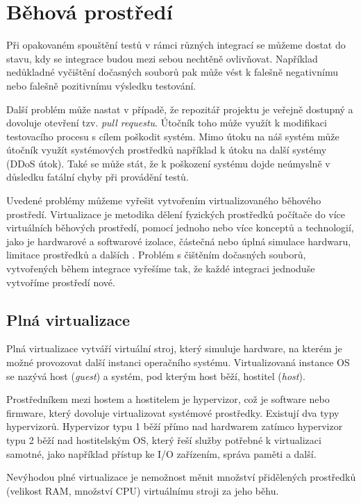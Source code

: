 \section{Běhová prostředí}

Při opakovaném spouštění testů v rámci různých integrací se můžeme dostat do stavu, kdy se integrace budou mezi sebou nechtěně ovlivňovat.
Například nedůkladné vyčištění dočasných souborů pak může vést k falešně negativnímu nebo falešně pozitivnímu výsledku testování.

Další problém může nastat v případě, že repozitář projektu je veřejně dostupný a dovoluje otevření tzv. \textit{pull requestu}.
Útočník toho může využít k modifikaci testovacího procesu s cílem poškodit systém.
Mimo útoku na náš systém může útočník využít systémových prostředků například k útoku na další systémy (DDoS útok).
Také se může stát, že k poškození systému dojde neúmyslně v důsledku fatální chyby při provádění testů.

Uvedené problémy můžeme vyřešit vytvořením virtualizovaného běhového prostředí.
Virtualizace je metodika dělení fyzických prostředků počítače do více virtuálních běhových prostředí, pomocí jednoho nebo více konceptů a technologií, jako je hardwarové a softwarové izolace, částečná nebo úplná simulace hardwaru, limitace prostředků a dalších \cite{virt_intro}.
Problém s čištěním dočasných souborů, vytvořených během integrace vyřešíme tak, že každé integraci jednoduše vytvoříme prostředí nové.

\subsection{Plná virtualizace}

Plná virtualizace vytváří virtuální stroj, který simuluje hardware, na kterém je možné provozovat další instanci operačního systému.
Virtualizovaná instance OS se nazývá host (\textit{guest}) a systém, pod kterým host běží, hostitel (\textit{host}).

Prostředníkem mezi hostem a hostitelem je hypervizor, což je software nebo firmware, který dovoluje virtualizovat systémové prostředky.
Existují dva typy hypervizorů.
Hypervizor typu 1 běží přímo nad hardwarem zatímco hypervizor typu 2 běží nad hostitelským OS, který řeší služby potřebné k virtualizaci samotné, jako například přístup ke I/O zařízením, správa paměti a další.
\cite{hypervisor_def}

Nevýhodou plné virtualizace je nemožnost měnit množství přidělených prostředků (velikost RAM, množství CPU) virtuálnímu stroji za jeho běhu.

